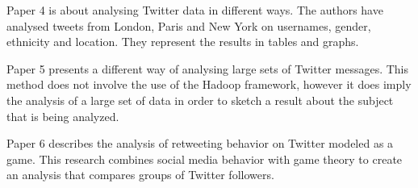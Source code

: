 Paper 4 is about analysing Twitter data in different ways. The authors have analysed tweets from London, Paris and New York on usernames, gender, ethnicity and location. They represent the results in tables and graphs.

Paper 5 presents a different way of analysing large sets of Twitter messages. This method does not involve the use of the Hadoop framework, however it does imply the analysis of a large set of data in order to sketch a result about the subject that is being analyzed.

Paper 6 describes the analysis of retweeting behavior on Twitter modeled as a game. This research combines social media behavior with game theory to create an analysis that compares groups of Twitter followers.